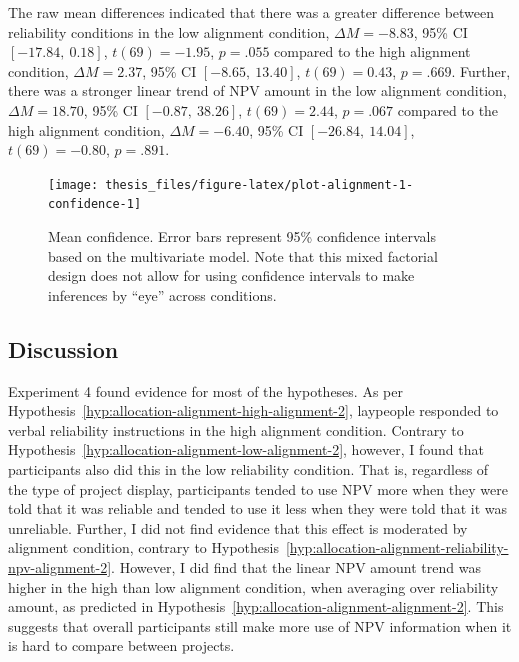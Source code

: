 \documentclass[a4paper, nobind, dvipsnames]{templates/ociamthesis}
\theoremstyle{definition}
\theoremstyle{definition}
\theoremstyle{definition}
\theoremstyle{definition}
\theoremstyle{remark}
\begin{document}
The raw mean differences indicated that there was a greater difference between
reliability conditions in the low alignment condition,
\(\Delta M = -8.83\), 95\% CI \([-17.84,~0.18]\), \(t(69) = -1.95\), \(p = .055\) compared to the high alignment
condition, \(\Delta M = 2.37\), 95\% CI \([-8.65,~13.40]\), \(t(69) = 0.43\), \(p = .669\). Further, there was
a stronger linear trend of NPV amount in the low alignment condition,
\(\Delta M = 18.70\), 95\% CI \([-0.87,~38.26]\), \(t(69) = 2.44\), \(p = .067\) compared to the high alignment
condition, \(\Delta M = -6.40\), 95\% CI \([-26.84,~14.04]\), \(t(69) = -0.80\), \(p = .891\).



\begin{figure}
\texttt{[image: thesis\_files/figure-latex/plot-alignment-1-confidence-1]} \caption{Mean confidence. Error bars represent 95\% confidence intervals based on the multivariate model. Note that this mixed factorial design does not allow for using confidence intervals to make inferences by ``eye'' across conditions.}\label{fig:plot-alignment-1-confidence}
\end{figure}

\hypertarget{discussion-11}{%
\subsection{Discussion}\label{discussion-11}}

Experiment 4 found evidence for most of the hypotheses. As per
Hypothesis~\ref{hyp:allocation-alignment-high-alignment-2}, laypeople responded
to verbal reliability instructions in the high alignment condition. Contrary to
Hypothesis~\ref{hyp:allocation-alignment-low-alignment-2}, however, I found that
participants also did this in the low reliability condition. That is, regardless
of the type of project display, participants tended to use NPV more when they
were told that it was reliable and tended to use it less when they were told
that it was unreliable. Further, I did not find evidence that this effect is
moderated by alignment condition, contrary to
Hypothesis~\ref{hyp:allocation-alignment-reliability-npv-alignment-2}. However,
I did find that the linear NPV amount trend was higher in the high than low
alignment condition, when averaging over reliability amount, as predicted in
Hypothesis~\ref{hyp:allocation-alignment-alignment-2}. This suggests that
overall participants still make more use of NPV information when it is hard to
compare between projects.
\end{document}
